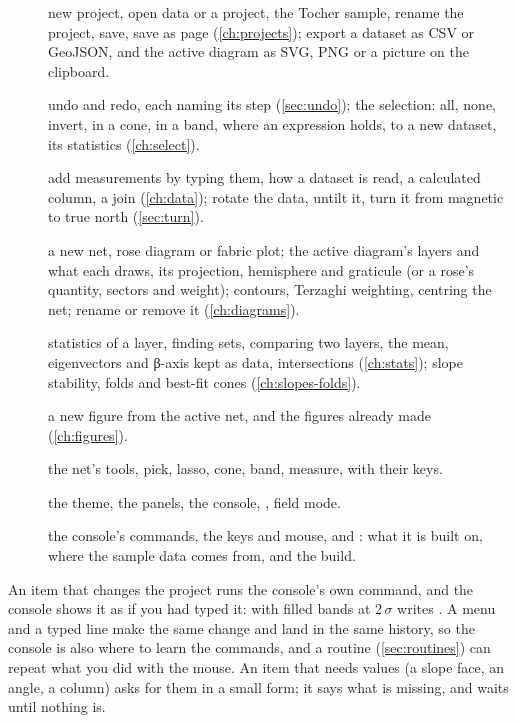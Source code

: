 \begin{description}
\item[] new project, open data or a project, the Tocher sample, rename the project, save,
save as page (\cref{ch:projects}); export a dataset as CSV or GeoJSON, and the active diagram as SVG, PNG
or a picture on the clipboard.
\item[] undo and redo, each naming its step (\cref{sec:undo}); the selection: all,
none, invert, in a cone, in a band, where an expression holds, to a new dataset, its statistics
(\cref{ch:select}).
\item[] add measurements by typing them, how a dataset is read, a calculated column,
a join (\cref{ch:data}); rotate the data, untilt it, turn it from magnetic to true north (\cref{sec:turn}).
\item[] a new net, rose diagram or fabric plot; the active diagram's layers and
what each draws, its projection, hemisphere and graticule (or a rose's quantity, sectors and weight);
contours, Terzaghi weighting, centring the net; rename or remove it (\cref{ch:diagrams}).
\item[] statistics of a layer, finding sets, comparing two layers, the mean,
eigenvectors and β-axis kept as data, intersections (\cref{ch:stats}); slope stability, folds and
best-fit cones (\cref{ch:slopes-folds}).
\item[] a new figure from the active net, and the figures already made (\cref{ch:figures}).
\item[] the net's tools, pick, lasso, cone, band, measure, with their keys.
\item[] the theme, the panels, the console, , field mode.
\item[] the console's commands, the keys and mouse, and : what it is
built on, where the sample data comes from, and the build.
\end{description}

An item that changes the project runs the console's own command, and the console shows it as if you had
typed it:  with filled bands at 2\,$\sigma$ writes . A menu and a typed line make the same change and land in the same history, so the console
is also where to learn the commands, and a routine (\cref{sec:routines}) can repeat what you did with the
mouse. An item that needs values (a slope face, an angle, a column) asks for them in a small form; it
says what is missing, and  waits until nothing is.

